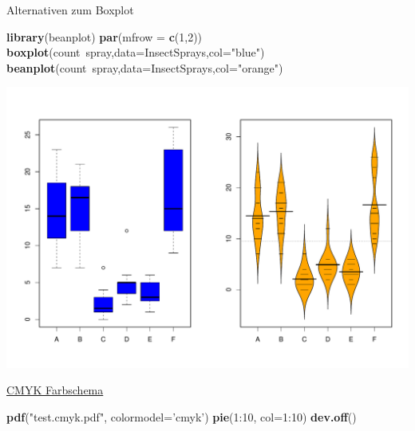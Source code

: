 \documentclass[ignorenonframetext,]{beamer}
\newenvironment{Shaded}{}{}
\newcommand{\KeywordTok}[1]{\textcolor[rgb]{0.00,0.44,0.13}{\textbf{{#1}}}}
\newcommand{\DataTypeTok}[1]{\textcolor[rgb]{0.56,0.13,0.00}{{#1}}}
\newcommand{\DecValTok}[1]{\textcolor[rgb]{0.25,0.63,0.44}{{#1}}}
\newcommand{\StringTok}[1]{\textcolor[rgb]{0.25,0.44,0.63}{{#1}}}
\newcommand{\NormalTok}[1]{{#1}}
\begin{document}
\begin{frame}[fragile]{Alternativen zum Boxplot}

\begin{Shaded}
\begin{Highlighting}[]
\KeywordTok{library}\NormalTok{(beanplot)}
\KeywordTok{par}\NormalTok{(}\DataTypeTok{mfrow =} \KeywordTok{c}\NormalTok{(}\DecValTok{1}\NormalTok{,}\DecValTok{2}\NormalTok{))}
\KeywordTok{boxplot}\NormalTok{(count~spray,}\DataTypeTok{data=}\NormalTok{InsectSprays,}\DataTypeTok{col=}\StringTok{"blue"}\NormalTok{)}
\KeywordTok{beanplot}\NormalTok{(count~spray,}\DataTypeTok{data=}\NormalTok{InsectSprays,}\DataTypeTok{col=}\StringTok{"orange"}\NormalTok{)}
\end{Highlighting}
\end{Shaded}

\includegraphics{R_intern_files/figure-beamer/unnamed-chunk-170-1.pdf}

\end{frame}

\begin{frame}[fragile]{\href{https://www.r-bloggers.com/draw-figures-in-cmyk-mode-in-r/}{CMYK
Farbschema}}

\begin{Shaded}
\begin{Highlighting}[]
\KeywordTok{pdf}\NormalTok{(}\StringTok{"test.cmyk.pdf"}\NormalTok{, }\DataTypeTok{colormodel=}\StringTok{'cmyk'}\NormalTok{)}
\KeywordTok{pie}\NormalTok{(}\DecValTok{1}\NormalTok{:}\DecValTok{10}\NormalTok{, }\DataTypeTok{col=}\DecValTok{1}\NormalTok{:}\DecValTok{10}\NormalTok{)}
\KeywordTok{dev.off}\NormalTok{() }
\end{Highlighting}
\end{Shaded}

\end{frame}
\end{document}
